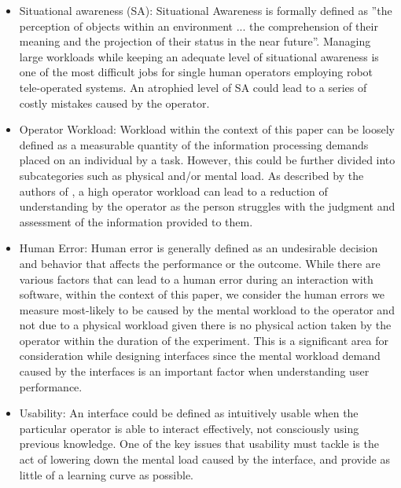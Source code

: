 \documentclass[conference]{IEEEtran}
\begin{document}
\begin{itemize}
\item Situational awareness (SA): 
Situational Awareness is formally defined as ”the perception of objects within an environment ... the comprehension of their meaning and the projection of their status in the near future”. \cite{b5} Managing large workloads while keeping an adequate level of situational awareness is one of the most difficult jobs for single human operators employing robot tele-operated systems. An atrophied level of SA could lead to a series of costly mistakes caused by the operator. \cite{b6}
\item Operator Workload:     
 Workload within the context of this paper can be loosely defined as a measurable quantity of the information processing demands placed on an individual by a task. \cite{b7} However, this could be further divided into subcategories such as physical and/or mental load. \cite{b8} As described by the authors of \cite{b9}, a high operator workload can lead to a reduction of understanding by the operator as the person struggles with the judgment and assessment of the information provided to them. \cite{b9}

\item{Human Error}:
Human error is generally defined as an undesirable decision and behavior that affects the performance or the outcome. \cite{b10} While there are various factors that can lead to a human error during an interaction with software, within the context of this paper, we consider the human errors we measure most-likely to be caused by the mental workload to the operator and not due to a physical workload given there is no physical action taken by the operator within the duration of the experiment. This is a significant area for consideration while designing interfaces since the mental workload demand caused by the interfaces is an important factor when understanding user performance. \cite{b11} \\

\item Usability: 
An interface could be defined as intuitively usable when the particular operator is able to interact effectively, not consciously using previous knowledge.  \cite{b12} One of the key issues that usability must tackle is the act of lowering down the mental load caused by the interface, and provide as little of a learning curve as possible. 
\end{itemize}
\end{document}
